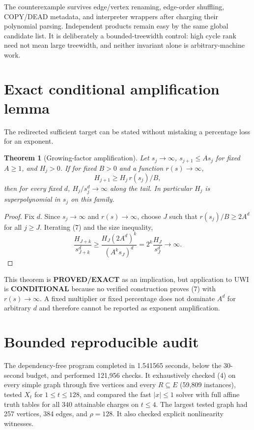 \documentclass[11pt]{article}
\newtheorem{theorem}{Theorem}
\newcommand{\EXACT}{\textbf{PROVED/EXACT}}
\newcommand{\COND}{\textbf{CONDITIONAL}}
\begin{document}
The counterexample survives edge/vertex renaming, edge-order shuffling,
COPY/DEAD metadata, and interpreter wrappers after charging their polynomial
parsing.  Independent products remain easy by the same global candidate list.
It is deliberately a bounded-treewidth control: high cycle rank need not mean
large treewidth, and neither invariant alone is arbitrary-machine work.

\section{Exact conditional amplification lemma}
The redirected sufficient target can be stated without mistaking a percentage
loss for an exponent.

\begin{theorem}[Growing-factor amplification]
Let $s_j\to\infty$, $s_{j+1}\le A s_j$ for fixed $A\ge1$, and $H_j>0$.  If
for fixed $B>0$ and a function $r(s)\to\infty$,
\[
 H_{j+1}\ge H_j\,r(s_j)/B,                                \tag{7}
\]
then for every fixed $d$, $H_j/s_j^d\to\infty$ along the tail.  In particular
$H_j$ is superpolynomial in $s_j$ on this family.
\end{theorem}
\begin{proof}
Fix $d$.  Since $s_j\to\infty$ and $r(s)\to\infty$, choose $J$ such that
$r(s_j)/B\ge2A^d$ for all $j\ge J$.  Iterating (7) and the size inequality,
\[
 \frac{H_{J+k}}{s_{J+k}^d}
 \ge \frac{H_J(2A^d)^k}{(A^ks_J)^d}
 =2^k\frac{H_J}{s_J^d}\longrightarrow\infty.
\]
\end{proof}

This theorem is \EXACT{} as an implication, but application to UWI is
\COND{} because no verified construction proves (7) with $r(s)\to\infty$.
A fixed multiplier or fixed percentage does not dominate $A^d$ for arbitrary
$d$ and therefore cannot be reported as exponent amplification.

\section{Bounded reproducible audit}
The dependency-free program
 completed in
1.541565 seconds, below the 30-second budget, and performed 121,956 checks.
It exhaustively checked (4) on every simple graph through five vertices and
every $R\subseteq E$ (59,809 instances), tested $X_t$ for $1\le t\le128$, and
compared the fast $|x|\le1$ solver with full affine truth tables for all 340
attainable charges on $t\le4$.  The largest tested graph had 257 vertices,
384 edges, and $\rho=128$.  It also checked explicit nonlinearity witnesses.
\end{document}
